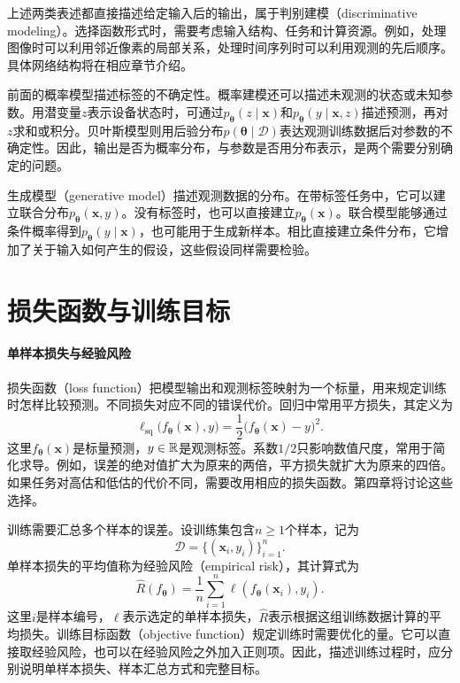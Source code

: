 上述两类表述都直接描述给定输入后的输出，属于判别建模（discriminative modeling）。选择函数形式时，需要考虑输入结构、任务和计算资源。例如，处理图像时可以利用邻近像素的局部关系，处理时间序列时可以利用观测的先后顺序。具体网络结构将在相应章节介绍。

前面的概率模型描述标签的不确定性。概率建模还可以描述未观测的状态或未知参数。用潜变量$z$表示设备状态时，可通过$p_{\bm\theta}(z\mid\bm x)$和$p_{\bm\theta}(y\mid\bm x,z)$描述预测，再对$z$求和或积分。贝叶斯模型则用后验分布$p(\bm\theta\mid\mathcal D)$表达观测训练数据后对参数的不确定性。因此，输出是否为概率分布，与参数是否用分布表示，是两个需要分别确定的问题。

生成模型（generative model）描述观测数据的分布。在带标签任务中，它可以建立联合分布$p_{\bm\theta}(\bm x,y)$。没有标签时，也可以直接建立$p_{\bm\theta}(\bm x)$。联合模型能够通过条件概率得到$p_{\bm\theta}(y\mid\bm x)$，也可能用于生成新样本。相比直接建立条件分布，它增加了关于输入如何产生的假设，这些假设同样需要检验。

\section{损失函数与训练目标}

\paragraph{单样本损失与经验风险}
损失函数（loss function）把模型输出和观测标签映射为一个标量，用来规定训练时怎样比较预测。不同损失对应不同的错误代价。回归中常用平方损失，其定义为
\begin{equation}
 \ell_{\mathrm{sq}}\bigl(f_{\bm{\theta}}(\bm{x}),y\bigr)=\frac12\bigl(f_{\bm{\theta}}(\bm{x})-y\bigr)^2.
\end{equation}
这里$f_{\bm\theta}(\bm x)$是标量预测，$y\in\mathbb{R}$是观测标签。系数$1/2$只影响数值尺度，常用于简化求导。例如，误差的绝对值扩大为原来的两倍，平方损失就扩大为原来的四倍。如果任务对高估和低估的代价不同，需要改用相应的损失函数。第四章将讨论这些选择。

训练需要汇总多个样本的误差。设训练集包含$n\geq1$个样本，记为
\begin{equation}
 \mathcal D=\{(\bm x_i,y_i)\}_{i=1}^n.
\end{equation}
单样本损失的平均值称为经验风险（empirical risk），其计算式为
\begin{equation}
 \hat R(f_{\bm\theta})=\frac1n\sum_{i=1}^n\ell(f_{\bm\theta}(\bm x_i),y_i).
\end{equation}
这里$i$是样本编号，$\ell$表示选定的单样本损失，$\hat R$表示根据这组训练数据计算的平均损失。训练目标函数（objective function）规定训练时需要优化的量。它可以直接取经验风险，也可以在经验风险之外加入正则项。因此，描述训练过程时，应分别说明单样本损失、样本汇总方式和完整目标。

